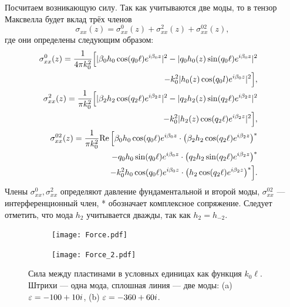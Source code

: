 Посчитаем возникающую силу. Так как учитываются две моды, то в тензор Максвелла будет вклад трёх членов
\begin{equation}
  \sigma_{xx}(z) = \sigma_{xx}^0(z)+ \sigma_{xx}^2(z)  + \sigma_{xx}^{02}(z),
\end{equation}
где они определены следующим образом:
\begin{align}
\sigma_{xx}^{0}(z) = \frac{1}{4 \pi k_0^2}\Bigl[\lvert\beta_{0} h_{0} \cos(q_{0}\ell) e^{i \beta_{0} z}\rvert^2   
-\lvert q_{0} h_{0}(z) \sin(q_{0}\ell) e^{i \beta_{0} z}\rvert^2 \nonumber \\
- k_0^2\lvert h_{0}(z) \cos(q_{0} l) e^{i \beta_{0} z}\rvert^2\Bigr],\nonumber\\
\sigma_{xx}^{2}(z) = \frac{1}{\pi k_0^2}\Bigl[\lvert\beta_{2} h_{2} \cos(q_{2}\ell) e^{i \beta_{2} z}\rvert^2
-\lvert q_{2} h_{2}(z) \sin(q_{2}\ell) e^{i \beta_{2} z}\rvert^2 \nonumber \\
- k_0^2\lvert h_{2}(z) \cos(q_{2}\ell) e^{i \beta_{2} z}\rvert^2\Bigr],\nonumber\\
\sigma_{xx}^{02}(z) = \frac{1}{ \pi k_0^2} \textrm{Re}\,\Bigl[  \beta_0 h_0 \cos(q_0\ell) e^{i \beta_0 z} \cdot \big(\beta_2 h_2 \cos(q_2\ell) e^{i \beta_2 z}\big)^{*}\nonumber\\
- q_0 h_0 \sin(q_0\ell) e^{i \beta_0 z} \cdot \big(q_2 h_2 \sin(q_2\ell) e^{i \beta_2 z}\big)^{*}\nonumber&\\
- k_0^2 h_0 \cos(q_0\ell) e^{i \beta_0 z} \cdot \big(h_2 \cos(q_2\ell) e^{i \beta_2 z}\big)^{*}\Bigr].&\nonumber
\end{align}
Члены $\sigma_{xx}^{0}, \sigma_{xx}^{2}$ определяют давление фундаментальной и второй моды, $\sigma_{xx}^{02}$  --- интерференционный член, * обозначает комплексное сопряжение. Следует отметить, что мода $h_2$ учитывается дважды, так как $h_2 = h_{-2}$.

\begin{figure}
  \begin{subfigure}[t]{0.75\textwidth}
    \texttt{[image: Force.pdf]}
    \caption{}
  \end{subfigure}
  \begin{subfigure}[t]{0.75\textwidth}
    \texttt{[image: Force\_2.pdf]}
    \caption{}
  \end{subfigure}
  \caption{Сила между пластинами в условных единицах как функция  $k_0 \ell$. Штрихи --- одна мода, сплошная линия --- две моды: (a) $\varepsilon=-100+10i$, (b) $\varepsilon = -360 + 60i$.}
  \label{fig:F}
\end{figure}

